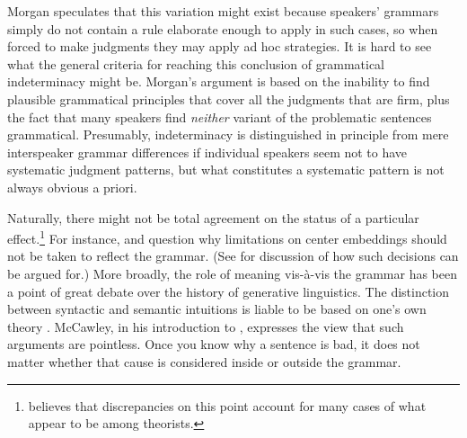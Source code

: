 \ea\label{ex:2:4}
\z
\z


\noindent
Morgan speculates that this  variation might exist because speakers' grammars simply do not contain a rule elaborate enough to apply in such cases, so when forced to make judgments they may apply ad hoc strategies. It is hard to see what the general criteria for reaching this conclusion of grammatical indeterminacy might be. Morgan's argument is based on the inability to find plausible grammatical principles that cover all the judgments that are firm, plus the fact that many speakers find \textit{neither} variant of the problematic sentences grammatical. Presumably, indeterminacy is distinguished in principle from mere interspeaker grammar differences if individual speakers seem not to have systematic judgment patterns, but what constitutes a systematic pattern is not always obvious a priori.


Naturally, there might not be total agreement on the status of a particular effect.\footnote{\citet{Newmeyer1983} believes that discrepancies on this point account for many cases of what appear to be  among theorists.
} For instance, \citet{Reich1969} and \citet{Spencer1973} question why limitations on center embeddings should not  be taken to reflect the grammar. (See \citet{KatzEtAl1976} for discussion of how such decisions can be argued for.) More broadly, the role of meaning vis-à-vis the grammar has been a point of great debate over the history of generative linguistics. The distinction between syntactic and semantic intuitions is liable to be based on one's own theory \citep{Cohen1981}. McCawley, in his introduction to \citet{Postal1976}, expresses the view that such arguments are pointless. Once you know why a sentence is bad, it does not matter whether that cause is considered inside or outside the grammar.

